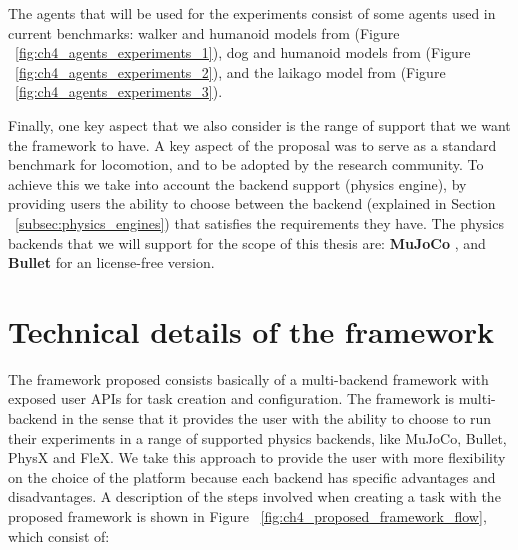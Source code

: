 The agents that will be used for the experiments consist of some agents used in current
benchmarks: walker and humanoid models from \cite{Controlsuite} (Figure ~\ref{fig:ch4_agents_experiments_1}), 
dog and humanoid models from \cite{TerrainRLSim} (Figure ~\ref{fig:ch4_agents_experiments_2}), 
and the laikago model from \cite{PyBullet} (Figure ~\ref{fig:ch4_agents_experiments_3}).

\figAgentsExperimentsOne

\figAgentsExperimentsTwo

\figAgentsExperimentsThree

Finally, one key aspect that we also consider is the range of support that we want the
framework to have. A key aspect of the proposal was to serve as a standard benchmark
for locomotion, and to be adopted by the research community. To achieve this we take
into account the backend support (physics engine), by providing users the ability
to choose between the backend (explained in Section ~\ref{subsec:physics_engines}) 
that satisfies the requirements they have. The physics backends that we will support
for the scope of this thesis are: \textbf{MuJoCo} \citep{MuJoCo}, and \textbf{Bullet} 
\citep{Bullet} for an license-free version.

\section{Technical details of the framework}

The framework proposed consists basically of a multi-backend framework with exposed user APIs 
for task creation and configuration. The framework is multi-backend
in the sense that it provides the user with the ability to choose to run their experiments
in a range of supported physics backends, like MuJoCo, Bullet, PhysX and FleX. We take
this approach to provide the user with more flexibility on the choice of the platform because
each backend has specific advantages and disadvantages. A description of the steps involved 
when creating a task with the proposed framework is shown in Figure ~\ref{fig:ch4_proposed_framework_flow}, 
which consist of:

